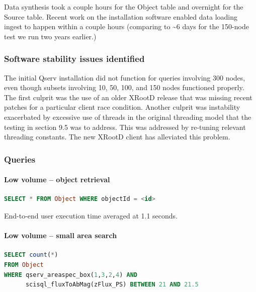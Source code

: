 \documentclass[DM,lsstdraft,toc]{lsstdoc}
\begin{document}
Data synthesis took a couple hours for the Object table and overnight
for the Source table. Recent work on the installation software enabled
data loading ingest to happen within a couple hours (comparing to
\textasciitilde{}6 days for the 150-node test we run two years earlier.)

\subsubsection{Software stability issues
identified}\label{software-stability-issues-identified}

The initial Qserv installation did not function for queries involving
300 nodes, even though subsets involving 10, 50, 100, and 150 nodes
functioned properly. The first culprit was the use of an older
XRootD release that was missing recent patches
for a particular client race condition. Another culprit was instability
exacerbated by excessive use of threads in the original threading model
that the testing in section 9.5 was to address. This was addressed by
re-tuning relevant threading constants. The new
XRootD client has alleviated this problem.

\subsubsection{Queries}\label{queries-1}

\paragraph{Low volume -- object
retrieval}\label{low-volume-object-retrieval}

\begin{lstlisting}[language=SQL]
SELECT * FROM Object WHERE objectId = <id>
\end{lstlisting}

End-to-end user execution time averaged at 1.1 seconds.

\paragraph{Low volume -- small area
search}\label{low-volume-small-area-search}

\begin{lstlisting}[language=SQL]
SELECT count(*)
FROM Object
WHERE qserv_areaspec_box(1,3,2,4) AND
      scisql_fluxToAbMag(zFlux_PS) BETWEEN 21 AND 21.5
\end{lstlisting}
\end{document}
